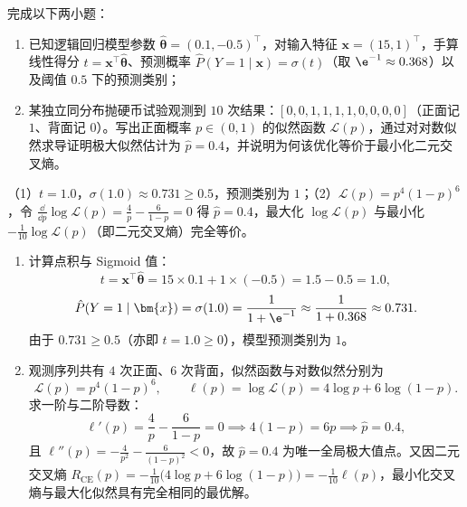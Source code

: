 \begin{exercise}[title={逻辑回归预测与伯努利极大似然估计推导},level=standard,points=15,tags={逻辑回归,Sigmoid,MLE,交叉熵}]
完成以下两小题：
\begin{enumerate}
  \item 已知逻辑回归模型参数 $\hat{\bm{\theta}} = (0.1, -0.5)^\top$，对输入特征 $\bm{x} = (15, 1)^\top$，手算线性得分 $t = \bm{x}^\top\hat{\bm{\theta}}$、预测概率 $\hat{P}(Y=1\mid\bm{x}) = \sigma(t)$（取 $\e^{-1}\approx 0.368$）以及阈值 $0.5$ 下的预测类别；
  \item 某独立同分布抛硬币试验观测到 $10$ 次结果：$[0,0,1,1,1,1,0,0,0,0]$（正面记 $1$、背面记 $0$）。写出正面概率 $p\in(0,1)$ 的似然函数 $\mathcal{L}(p)$，通过对对数似然求导证明极大似然估计为 $\hat{p} = 0.4$，并说明为何该优化等价于最小化二元交叉熵。
\end{enumerate}
\begin{answer}
（1）$t = 1.0$，$\sigma(1.0) \approx 0.731 \ge 0.5$，预测类别为 $1$；（2）$\mathcal{L}(p) = p^4(1-p)^6$，令 $\frac{\dd}{\dd p}\log\mathcal{L}(p) = \frac{4}{p} - \frac{6}{1-p} = 0$ 得 $\hat{p}=0.4$，最大化 $\log\mathcal{L}(p)$ 与最小化 $-\frac{1}{10}\log\mathcal{L}(p)$（即二元交叉熵）完全等价。
\end{answer}
\begin{solution}
\begin{enumerate}
  \item 计算点积与 Sigmoid 值：
  \[
    t = \bm{x}^\top\hat{\bm{\theta}} = 15\times 0.1 + 1\times(-0.5) = 1.5 - 0.5 = 1.0,
  \]
  \[
    \hat{P}(Y=1\mid\bm{x}) = \sigma(1.0) = \frac{1}{1 + \e^{-1}} \approx \frac{1}{1 + 0.368} \approx 0.731.
  \]
  由于 $0.731 \ge 0.5$（亦即 $t = 1.0 \ge 0$），模型预测类别为 $1$。
  \item 观测序列共有 $4$ 次正面、$6$ 次背面，似然函数与对数似然分别为
  \[
    \mathcal{L}(p) = p^4(1-p)^6,\qquad
    \ell(p) = \log\mathcal{L}(p) = 4\log p + 6\log(1-p).
  \]
  求一阶与二阶导数：
  \[
    \ell'(p) = \frac{4}{p} - \frac{6}{1-p} = 0 \implies 4(1-p) = 6p \implies \hat{p} = 0.4,
  \]
  且 $\ell''(p) = -\frac{4}{p^2} - \frac{6}{(1-p)^2} < 0$，故 $\hat{p}=0.4$ 为唯一全局极大值点。又因二元交叉熵 $R_{\mathrm{CE}}(p) = -\frac{1}{10}\bigl(4\log p + 6\log(1-p)\bigr) = -\frac{1}{10}\ell(p)$，最小化交叉熵与最大化似然具有完全相同的最优解。
\end{enumerate}
\end{solution}
\end{exercise}


